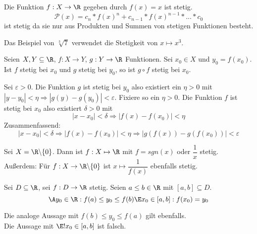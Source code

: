 \documentclass[main.tex]{subfiles}
\begin{document}
\begin{Beweis}
  Die Funktion $f: X \to \R$ gegeben durch $f(x) = x$ ist stetig.
  $$\mathcal{P}(x) = c_n * f(x)^n + c_{n-1} * f(x)^{n-1}* ... * c_0$$
  ist stetig da sie nur aus Produkten und Summen von stetigen Funktionen besteht.
\end{Beweis}

\begin{Beispiel}
  Das Beispiel von $\sqrt[3]{7}$ verwendet die Stetigkeit von $x \mapsto x^3$.
\end{Beispiel}

\begin{Theorem}
  Seien $X,Y  \subseteq \R$, $f: X \to Y$, $g: Y \to \R$ Funktionen. Sei $x_0 \in X$ und $y_0 = f(x_0)$.\\
  Ist $f$ stetig bei $x_0$ und $g$ stetig bei $y_0$, so ist $g \circ f$ stetig bei $x_0$.
\end{Theorem}

\begin{Beweis}
    Sei $\varepsilon > 0$. Die Funktion $g$ ist stetig bei $y_0$ also existiert ein $\eta > 0$ mit $|y - y_0| < \eta \Rightarrow |g(y) -g(y_0)| < \varepsilon$. Fixiere so ein $\eta > 0$. Die Funktion $f$ ist stetig bei $x_0$ also existiert $\delta > 0$ mit
    $$|x -x_0| < \delta \Rightarrow |f(x)- f(x_0)| < \eta$$
    Zusammenfassend:
    $$|x -x_0| < \delta \Rightarrow |f(x)- f(x_0)| < \eta \Rightarrow |g(f(x)) - g(f(x_0))| < \varepsilon$$
\end{Beweis}

\begin{Bemerkung}
  Sei $X = \R \backslash \{0\}$. Dann ist $f: X \mapsto \R$ mit $f= sgn(x)$ oder $\dfrac{1}{x}$ stetig.\\
  Außerdem: Für $f:X \to \R \backslash \{0\}$ ist $x \mapsto \dfrac{1}{f(x)}$ ebenfalls stetig.
\end{Bemerkung}

\begin{Theorem}[Zwischenwertsatz]
  Sei $D \subseteq \R$, sei $f: D \to \R$ stetig. Seien $a \leq b \in \R$ mit $[a,b] \subseteq D$.\\
  $$\A y_0 \in \R : f(a) \leq y_0 \leq f(b) \E x_0 \in [a,b]: f(x_0) = y_0$$
\end{Theorem}

\begin{Bemerkung}
  Die analoge Aussage mit $f(b)\leq y_0 \leq f(a)$ gilt ebenfalls.\\
  Die Aussage mit $\E ! x_0 \in [a,b]$ ist falsch.
\end{Bemerkung}
\end{document}
